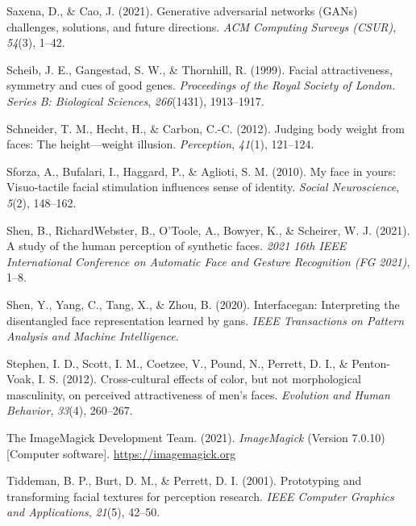 \documentclass[
  doc,floatsintext]{apa6}
\newlength{\cslhangindent}
\newlength{\cslentryspacingunit} %
\newenvironment{CSLReferences}[2] %
 {%
  \setlength{\parindent}{0pt}
  \ifodd #1
  \let\oldpar\par
  \def\par{\hangindent=\cslhangindent\oldpar}
  \fi
  \setlength{\parskip}{#2\cslentryspacingunit}
 }%
 {}
\begin{document}
\begin{CSLReferences}{1}{0}
\leavevmode{}%
Saxena, D., \& Cao, J. (2021). Generative adversarial networks (GANs) challenges, solutions, and future directions. \emph{ACM Computing Surveys (CSUR)}, \emph{54}(3), 1--42.

\leavevmode{}%
Scheib, J. E., Gangestad, S. W., \& Thornhill, R. (1999). Facial attractiveness, symmetry and cues of good genes. \emph{Proceedings of the Royal Society of London. Series B: Biological Sciences}, \emph{266}(1431), 1913--1917.

\leavevmode{}%
Schneider, T. M., Hecht, H., \& Carbon, C.-C. (2012). Judging body weight from faces: The height---weight illusion. \emph{Perception}, \emph{41}(1), 121--124.

\leavevmode{}%
Sforza, A., Bufalari, I., Haggard, P., \& Aglioti, S. M. (2010). My face in yours: Visuo-tactile facial stimulation influences sense of identity. \emph{Social Neuroscience}, \emph{5}(2), 148--162.

\leavevmode{}%
Shen, B., RichardWebster, B., O'Toole, A., Bowyer, K., \& Scheirer, W. J. (2021). A study of the human perception of synthetic faces. \emph{2021 16th IEEE International Conference on Automatic Face and Gesture Recognition (FG 2021)}, 1--8.

\leavevmode{}%
Shen, Y., Yang, C., Tang, X., \& Zhou, B. (2020). Interfacegan: Interpreting the disentangled face representation learned by gans. \emph{IEEE Transactions on Pattern Analysis and Machine Intelligence}.

\leavevmode{}%
Stephen, I. D., Scott, I. M., Coetzee, V., Pound, N., Perrett, D. I., \& Penton-Voak, I. S. (2012). Cross-cultural effects of color, but not morphological masculinity, on perceived attractiveness of men's faces. \emph{Evolution and Human Behavior}, \emph{33}(4), 260--267.

\leavevmode{}%
The ImageMagick Development Team. (2021). \emph{ImageMagick} (Version 7.0.10) {[}Computer software{]}. \url{https://imagemagick.org}

\leavevmode{}%
Tiddeman, B. P., Burt, D. M., \& Perrett, D. I. (2001). Prototyping and transforming facial textures for perception research. \emph{IEEE Computer Graphics and Applications}, \emph{21}(5), 42--50.


\end{CSLReferences}
\end{document}
